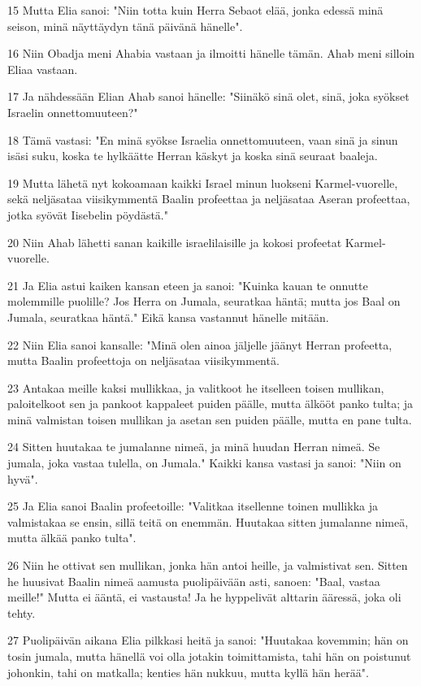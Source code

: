 \par 15 Mutta Elia sanoi: "Niin totta kuin Herra Sebaot elää, jonka edessä minä seison, minä näyttäydyn tänä päivänä hänelle".
\par 16 Niin Obadja meni Ahabia vastaan ja ilmoitti hänelle tämän. Ahab meni silloin Eliaa vastaan.
\par 17 Ja nähdessään Elian Ahab sanoi hänelle: "Siinäkö sinä olet, sinä, joka syökset Israelin onnettomuuteen?"
\par 18 Tämä vastasi: "En minä syökse Israelia onnettomuuteen, vaan sinä ja sinun isäsi suku, koska te hylkäätte Herran käskyt ja koska sinä seuraat baaleja.
\par 19 Mutta lähetä nyt kokoamaan kaikki Israel minun luokseni Karmel-vuorelle, sekä neljäsataa viisikymmentä Baalin profeettaa ja neljäsataa Aseran profeettaa, jotka syövät Iisebelin pöydästä."
\par 20 Niin Ahab lähetti sanan kaikille israelilaisille ja kokosi profeetat Karmel-vuorelle.
\par 21 Ja Elia astui kaiken kansan eteen ja sanoi: "Kuinka kauan te onnutte molemmille puolille? Jos Herra on Jumala, seuratkaa häntä; mutta jos Baal on Jumala, seuratkaa häntä." Eikä kansa vastannut hänelle mitään.
\par 22 Niin Elia sanoi kansalle: "Minä olen ainoa jäljelle jäänyt Herran profeetta, mutta Baalin profeettoja on neljäsataa viisikymmentä.
\par 23 Antakaa meille kaksi mullikkaa, ja valitkoot he itselleen toisen mullikan, paloitelkoot sen ja pankoot kappaleet puiden päälle, mutta älkööt panko tulta; ja minä valmistan toisen mullikan ja asetan sen puiden päälle, mutta en pane tulta.
\par 24 Sitten huutakaa te jumalanne nimeä, ja minä huudan Herran nimeä. Se jumala, joka vastaa tulella, on Jumala." Kaikki kansa vastasi ja sanoi: "Niin on hyvä".
\par 25 Ja Elia sanoi Baalin profeetoille: "Valitkaa itsellenne toinen mullikka ja valmistakaa se ensin, sillä teitä on enemmän. Huutakaa sitten jumalanne nimeä, mutta älkää panko tulta".
\par 26 Niin he ottivat sen mullikan, jonka hän antoi heille, ja valmistivat sen. Sitten he huusivat Baalin nimeä aamusta puolipäivään asti, sanoen: "Baal, vastaa meille!" Mutta ei ääntä, ei vastausta! Ja he hyppelivät alttarin ääressä, joka oli tehty.
\par 27 Puolipäivän aikana Elia pilkkasi heitä ja sanoi: "Huutakaa kovemmin; hän on tosin jumala, mutta hänellä voi olla jotakin toimittamista, tahi hän on poistunut johonkin, tahi on matkalla; kenties hän nukkuu, mutta kyllä hän herää".
